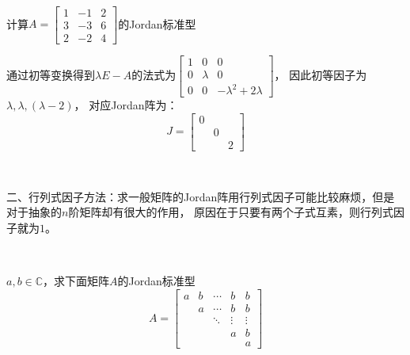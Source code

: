 ~

\begin{exercise}[初等变换方法计算Jordan标准型]
  计算$A = \left[
    \begin{array}{ccc}
      1&-1&2\\
      3&-3&6\\
      2&-2&4
    \end{array}
  \right]$的Jordan标准型
\end{exercise}

\begin{solution}
  通过初等变换得到$\lambda E - A$的法式为$\left[
    \begin{array}{ccc}
      1&0&0\\
      0&\lambda&0\\
      0&0&-\lambda^2 + 2\lambda
    \end{array}
  \right]$，
  因此初等因子为$\lambda,\lambda,(\lambda - 2)$，
  对应Jordan阵为：
  \begin{equation*}
    J = \left[
      \begin{array}{ccc}
        0&& \\
         &0& \\
         &&2
      \end{array}
    \right]
  \end{equation*}
\end{solution}

~

二、行列式因子方法：求一般矩阵的Jordan阵用行列式因子可能比较麻烦，但是对于抽象的$n$阶矩阵却有很大的作用，
原因在于只要有两个子式互素，则行列式因子就为$1$。

~

\begin{exercise}[经典而重要的题目]
  $a,b \in \mathbb{C}$，求下面矩阵$A$的Jordan标准型
  \begin{equation*}
    A = \left[
      \begin{array}{ccccc}
        a&b&\cdots&b&b \\
         &a&\cdots&b&b \\
         &&\ddots&\vdots&\vdots \\
         &&&a&b \\
         &&&&a
      \end{array}
    \right]
  \end{equation*}
\end{exercise}

